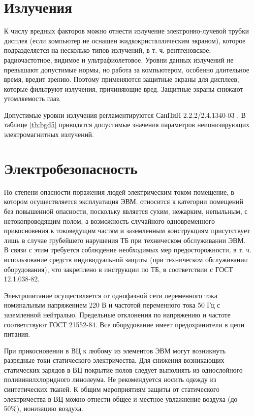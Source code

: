 \documentclass[12pt,a4paper]{report}
\begin{document}
\section{Излучения}

К числу вредных факторов можно отнести излучение электронно-лучевой трубки дисплея (если компьютер не оснащен жидкокристаллическим экраном), которое подразделяется на несколько типов излучений, в т. ч. рентгеновское, радиочастотное, видимое и ультрафиолетовое. Уровни данных излучений не превышают допустимые нормы, но работа за компьютером, особенно длительное время, вредит зрению. Поэтому применяются защитные экраны для дисплеев, которые фильтруют излучения, причиняющие вред. Защитные экраны снижают утомляемость глаз.

Допустимые уровни излучения регламентируются СанПиН 2.2.2/2.4.1340-03 \cite{SanPin-Hygiene}. В таблице \ref{tb:bgd5} приводятся допустимые значения параметров неионизирующих электромагнитных излучений. 

\section{Электробезопасность}

По степени опасности поражения людей электрическим током помещение, в котором осуществляется эксплуатация ЭВМ, относится к категории помещений без повышенной опасности, поскольку является сухим, нежарким, непыльным, с нетокопроводящим полом, а возможность случайного одновременного прикосновения к токоведущим частям и заземленным конструкциям присутствует лишь в случае грубейшего нарушения ТБ при техническом обслуживании ЭВМ. В связи с этим требуется соблюдение необходимых мер предосторожности, в т. ч. использование средств индивидуальной защиты (при техническом обслуживании оборудования), что закреплено в инструкции по ТБ, в соответствии с ГОСТ 12.1.038-82.

Электропитание осуществляется от однофазной сети переменного тока номинальным напряжением 220 В и частотой переменного тока 50 Гц с заземленной нейтралью. Предельные отклонения по напряжению и частоте соответствуют ГОСТ 21552-84. Все оборудование имеет предохранители в цепи питания.

При прикосновении в ВЦ к любому из элементов ЭВМ могут возникнуть разрядные токи статического электричества. Для снижения возникающих статических зарядов в ВЦ покрытие полов следует выполнять из однослойного поливинилхлоридного линолеума. Не рекомендуется носить одежду из синтетических тканей. К общим мероприятиям защиты от статического электричества в ВЦ можно отнести общее и местное увлажнение воздуха (до 50\%), ионизацию воздуха.
\end{document}
